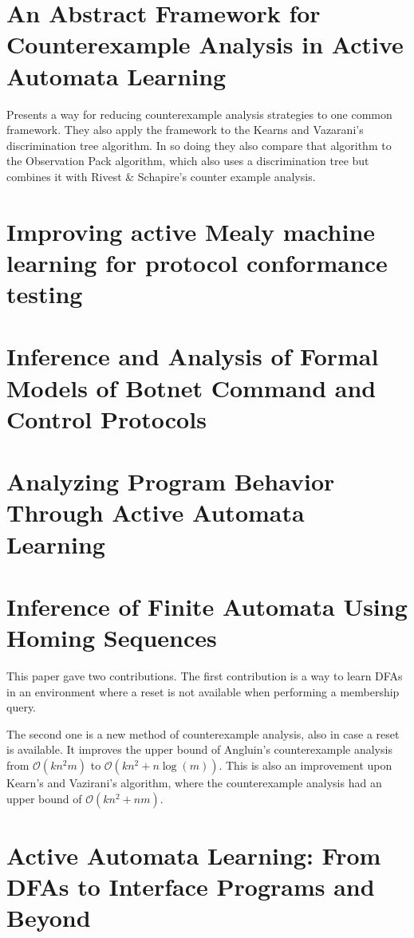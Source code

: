 \documentclass[11pt]{article}
\begin{document}
\section{An Abstract Framework for Counterexample Analysis in Active Automata Learning\cite{Isberner14a}}
Presents a way for reducing counterexample analysis strategies to one common
framework. They also apply the framework to the Kearns and Vazarani's
discrimination tree algorithm\cite{Kearns94}. In so doing they also compare that
algorithm to the Observation Pack algorithm, which also uses a discrimination
tree but combines it with Rivest \& Schapire's counter example
analysis\cite{Rivest93}.

\section{\cite{Aarts13} Improving active Mealy machine learning for protocol conformance testing}
\section{\cite{Cho10} Inference and Analysis of Formal Models of Botnet Command and Control Protocols}
\section{\cite{Bauer14} Analyzing Program Behavior Through Active Automata Learning}
\section{Inference of Finite Automata Using Homing Sequences\cite{Rivest93}}
This paper gave two contributions. The first contribution is a way to learn DFAs
in an environment where a reset is not available when performing a membership
query.

The second one is a new method of counterexample analysis, also in case a reset
is available. It improves the upper bound of Angluin's counterexample analysis
from $\mathcal{O}(kn^2m)$ to
$\mathcal{O}(kn^2 + n \log(m))$\cite{Angluin87,Rivest93}. This is also an
improvement upon Kearn's and Vazirani's algorithm, where the counterexample
analysis had an upper bound of
$\mathcal{O}(kn^2 + nm)$\cite{Kearns94,Isberner15}.
\section{\cite{Steffen12} Active Automata Learning: From DFAs to Interface Programs and Beyond}

{}

\end{document}
